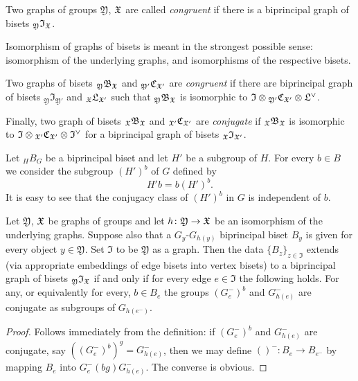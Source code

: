 \documentclass{amsart}
\begin{document}
\begin{defn}
  Two graphs of groups $\mathfrak Y$, ${\mathfrak X}$ are called \emph{congruent} if
  there is a biprincipal graph of bisets ${}_{\mathfrak Y} \mathfrak
  I_{{\mathfrak X}}$.

  Isomorphism of graphs of bisets is meant in the strongest possible sense:
  isomorphism of the underlying graphs, and isomorphisms of the respective
  bisets.

  Two graphs of bisets ${}_{\mathfrak Y} \mathfrak B_{{\mathfrak X}}$ and
  ${}_{\mathfrak Y'} \mathfrak C_{{\mathfrak X}'}$ are \emph{congruent} if there are
  biprincipal graph of bisets ${}_{\mathfrak Y} \mathfrak I_{\mathfrak Y'}$
  and ${}_{{\mathfrak X}} \mathfrak L_{{\mathfrak X}'}$ such that ${}_{\mathfrak Y} \mathfrak
  B_{{\mathfrak X}}$ is isomorphic to $\mathfrak I \otimes {}_{\mathfrak Y'}
  \mathfrak C_{{\mathfrak X}'} \otimes \mathfrak L^\vee$.

  Finally, two graph of bisets ${}_{{\mathfrak X}} \mathfrak B_{{\mathfrak X}}$ and ${}_{{\mathfrak X}'}
  \mathfrak C_{{\mathfrak X}'}$ are \emph{conjugate} if ${}_{{\mathfrak X}} \mathfrak B_{{\mathfrak X}}$
  is isomorphic to $\mathfrak I \otimes {}_{{\mathfrak X}'} \mathfrak C_{{\mathfrak X}'}
  \otimes \mathfrak I^\vee$ for a biprincipal graph of bisets ${}_{{\mathfrak X}}
  \mathfrak I_{{\mathfrak X}'}$.
\end{defn}

Let ${}_H B_G$ be a biprincipal biset and let $H'$ be a subgroup of $H$. For
every $b\in B$ we consider the subgroup $(H')^b$ of $G$ defined by
\[H' b = b(H')^b.
\]
It is easy to see that the conjugacy class of $(H')^b$ in $G$ is
independent of $b$.

\begin{lem}
  Let $\mathfrak Y$, ${\mathfrak X}$ be graphs of groups and let
  $h\colon \mathfrak Y\to{\mathfrak X}$ be an isomorphism of the underlying
  graphs. Suppose also that a $G_y$-$G_{h(y)}$ biprincipal biset $B_y$
  is given for every object $y\in \mathfrak Y$. Set $\mathfrak I$ to
  be $\mathfrak Y$ as a graph. Then the data
  $\{B_z\}_{z\in \mathfrak I}$ extends (via appropriate embeddings of
  edge bisets into vertex bisets) to a biprincipal graph of bisets
  ${}_{\mathfrak Y}\mathfrak I_{{\mathfrak X}}$ if and only if for every edge
  $e\in \mathfrak I$ the following holds. For any, or equivalently for
  every, $b\in B_e$ the groups $(G_{e}^{-})^b$ and $G_{h(e)}^-$ are
  conjugate as subgroups of $G_{h(e^-)}$.
\end{lem}
\begin{proof}
  Follows immediately from the definition: if $(G_{e}^{-})^b$ and
  $G_{h(e)}^-$ are conjugate, say $((G_{e}^{-})^b)^g=G_{h(e)}^-$, then we
  may define $()^-\colon B_e\to B_{e^-}$ by mapping $B_e$ into $G_{e}^{-}
  (b g) G_{h(e)}^-$. The converse is obvious.
\end{proof}
\end{document}
